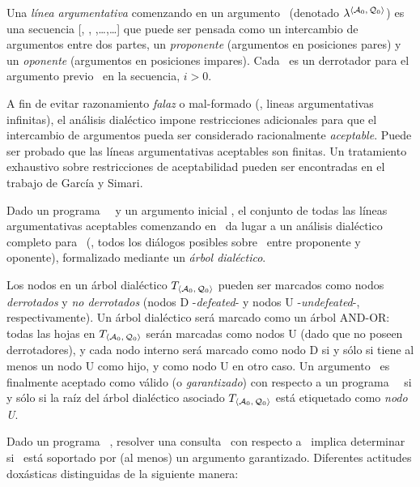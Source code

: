  Una \textit{línea argumentativa} comenzando en un argumento \AoQo\
 (denotado $\lambda^{\scriptsize \mbox{$\langle \mbox{${\mathcal A_0}$},\mbox{${\mathcal Q_0}$} \rangle $}}$) es una secuencia [\AoQo,
 \AaQa, \AbQb,\ldots,\AnQn\ldots] que puede ser pensada como un
 intercambio de  argumentos entre dos partes, un \textit{proponente}
 (argumentos en posiciones pares) y un \textit{oponente} (argumentos en
 posiciones impares). Cada \AiQi\ es un derrotador para el argumento
 previo \AimQim\ en la secuencia, $i > 0$.
 
 A fin de evitar razonamiento \textit{falaz} o mal-formado (\eg ,
 lineas argumentativas infinitas), el  análisis dialéctico impone
 restricciones adicionales para que el intercambio de argumentos pueda
 ser  considerado racionalmente \textit{aceptable}. Puede ser probado
 que las líneas argumentativas aceptables  son finitas. Un tratamiento
 exhaustivo sobre restricciones de aceptabilidad pueden ser encontradas
 en el trabajo de García y Simari\cite{delp04}.
 
 Dado un programa \DLP\ \PP\ y un argumento inicial \AoQo, el conjunto
 de todas las líneas argumentativas aceptables comenzando en \AoQo\ da
 lugar a un análisis dialéctico completo para \AoQo\ (\ie, todos los
 diálogos posibles sobre \AoQo\ entre proponente y oponente),
 formalizado mediante un \textit{árbol dialéctico}.
 
 Los nodos en un árbol dialéctico $T_{\scriptsize \mbox{$\langle \mbox{${\mathcal A_0}$},\mbox{${\mathcal Q_0}$} \rangle $}}$ pueden ser
 marcados como nodos \textit{derrotados}  y \textit{no derrotados}
 (nodos D -\textit{defeated}- y nodos U -\textit{undefeated}-,
 respectivamente).  Un árbol dialéctico será marcado como un árbol
 {\footnotesize AND-OR}: todas las hojas en  $T_{\scriptsize \mbox{$\langle \mbox{${\mathcal A_0}$},\mbox{${\mathcal Q_0}$} \rangle $}}$
 serán marcadas como nodos U (dado que no poseen derrotadores), y cada
 nodo interno  será marcado como nodo D si y sólo si tiene al menos un
 nodo U como hijo, y como nodo U en otro caso.  Un argumento \AoQo\ es
 finalmente aceptado como válido (o \textit{garantizado}) con respecto
 a un programa  \DLP\ \PP\  si y sólo si la raíz del árbol dialéctico
 asociado $T_{\scriptsize \mbox{$\langle \mbox{${\mathcal A_0}$},\mbox{${\mathcal Q_0}$} \rangle $}}$ está etiquetado como \textit{nodo U}.
 
 Dado un programa \DLP\ \PP, resolver una consulta \ArgQ\ con respecto
 a \PP\ implica determinar si \ArgQ\ está soportado por (al menos) un
 argumento garantizado. Diferentes actitudes doxásticas %
 distinguidas de la siguiente manera:
 
